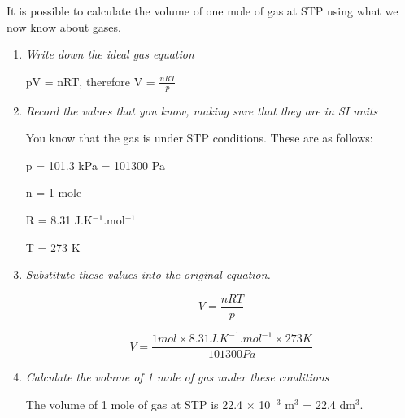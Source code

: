 It is possible to calculate the volume of one mole of gas at STP using what we now know about gases.

\begin{enumerate}

\item{\textit{Write down the ideal gas equation}}
\begin{center}
pV = nRT, therefore V = $\frac{nRT}{p}$
\end{center}

\item{\textit{Record the values that you know, making sure that they are in SI units}}

You know that the gas is under STP conditions. These are as follows:

p = 101.3 kPa = 101300 Pa

n = 1 mole

R = 8.31 J.K$^{-1}$.mol$^{-1}$

T = 273 K

\item{\textit{Substitute these values into the original equation.}}

\begin{equation*}
V = \frac{nRT}{p}
\end{equation*}

\begin{equation*}
V = \frac{1 mol \times 8.31 J.K^{-1}.mol^{-1} \times 273 K}{101300 Pa}
\end{equation*}

\item{\textit{Calculate the volume of 1 mole of gas under these conditions}

The volume of 1 mole of gas at STP is 22.4 $\times$ 10$^{-3}$ m$^{3}$ = 22.4 dm$^{3}$.}
\end{enumerate}


